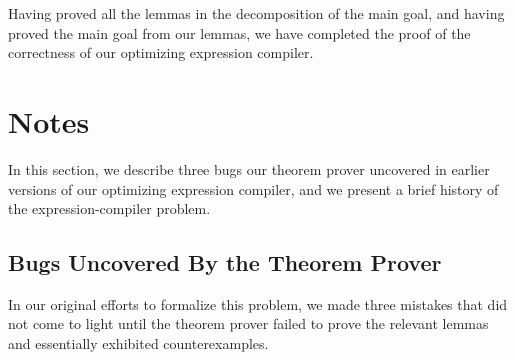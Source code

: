 \documentclass[11pt]{book}
\newcommand{\pubdefaulttextsize}{\large}
\begin{document}
Having proved all the lemmas in the decomposition of the
main goal, and having proved the main goal from our lemmas,
we have completed the proof
of the correctness
of our optimizing expression compiler.
\section{Notes}
\label{SSCOMPILERNOTES}
\pubdefaulttextsize
In this section, we describe
three bugs our theorem prover uncovered in earlier versions
of our optimizing expression compiler,
and we present a brief history of the expression-compiler problem.
\subsection{Bugs Uncovered By the Theorem Prover}
\pubdefaulttextsize
In our original efforts to formalize this problem, we made three 
mistakes that did not come to light until the theorem prover
failed to prove the  relevant lemmas and essentially exhibited counterexamples.
\end{document}
